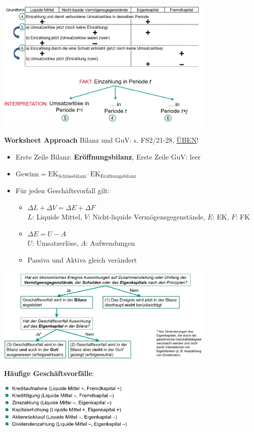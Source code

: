 \begin{center}
	\includegraphics[width=0.8\textwidth]{images/gf2.png}
\end{center}

\textbf{Worksheet Approach} Bilanz und GuV: s. FS2/21-28, \underline{ÜBEN}!
\begin{itemize}
	\item Erste Zeile Bilanz: \textbf{Eröffnungsbilanz}, Erste Zeile GuV: leer
	\item $\text{Gewinn}=\text{EK}_\text{Schlussbilanz}–\text{EK}_\text{Eröffnungsbilanz}$
	\item Für jeden Geschäftsvorfall gilt:
	\begin{itemize}
		\item $\Delta L + \Delta V=\Delta E+\Delta F$ \\
		$L$: Liquide Mittel, $V$: Nicht-liquide Vermögensgegenstände, $E$: EK, $F$: FK
		\item $\Delta E=U-A$\\
		$U$: Umsatzerlöse, $A$: Aufwendungen
		\item Passiva und Aktiva gleich verändert
	\end{itemize}
\end{itemize}
\begin{center}
	\includegraphics[width=0.8\textwidth]{images/sze.png}
\end{center}
\textbf{Häufige Geschäftsvorfälle}:
\begin{center}
	\includegraphics[width=0.5\textwidth]{images/gsv.png}
\end{center}
\bigskip

